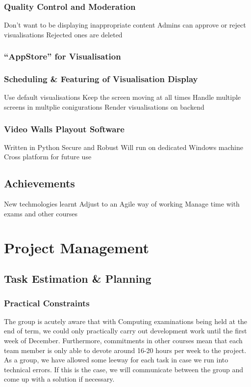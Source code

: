 ﻿\documentclass[a4paper, titlepage]{article}
\begin{document}
\subsubsection{Quality Control and Moderation}
Don't want to be displaying inappropriate content
Admins can approve or reject visualisations
Rejected ones are deleted


\subsubsection{``AppStore'' for Visualisation}

\subsubsection{Scheduling \& Featuring of Visualisation Display}
Use default visualisations
Keep the screen moving at all times
Handle multiple screens in multplie conigurations
Render visualisations on backend


\subsubsection{Video Walls Playout Software}
Written in Python
Secure and Robust
Will run on dedicated Windows machine
Cross platform for future use


\subsection{Achievements}
New techmologies learnt
Adjust to an Agile way of working
Manage time with exams and other courses


\newpage
\section{Project Management}

\subsection{Task Estimation \& Planning}

\subsubsection{Practical Constraints}
The group is acutely aware that with Computing examinations being held at the
end of term, we could only practically carry out development work until the
first week of December. Furthermore, commitments in other courses mean that 
each team member is only able to devote around 16-20 hours per week to
the project. As a group, we have allowed some leeway for each task in case we run into technical errors. If this is the case, we will communicate between the group and come up with a solution if necessary.
\end{document}
